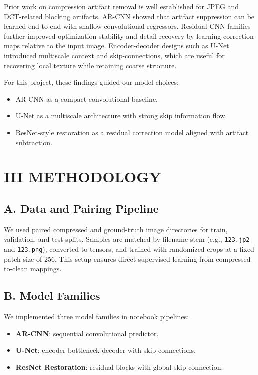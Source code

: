 \documentclass[12pt]{article}
\begin{document}
Prior work on compression artifact removal is well established for JPEG and DCT-related blocking artifacts. AR-CNN showed that artifact suppression can be learned end-to-end with shallow convolutional regressors. Residual CNN families further improved optimization stability and detail recovery by learning correction maps relative to the input image. Encoder-decoder designs such as U-Net introduced multiscale context and skip-connections, which are useful for recovering local texture while retaining coarse structure.

For this project, these findings guided our model choices:
\begin{itemize}
    \item AR-CNN as a compact convolutional baseline.
    \item U-Net as a multiscale architecture with strong skip information flow.
    \item ResNet-style restoration as a residual correction model aligned with artifact subtraction.
\end{itemize}

\section*{{\large III}\small{ METHODOLOGY}}

\subsection*{A. Data and Pairing Pipeline}

We used paired compressed and ground-truth image directories for train, validation, and test splits. Samples are matched by filename stem (e.g., \texttt{123.jp2} and \texttt{123.png}), converted to tensors, and trained with randomized crops at a fixed patch size of 256. This setup ensures direct supervised learning from compressed-to-clean mappings.

\subsection*{B. Model Families}

We implemented three model families in notebook pipelines:
\begin{itemize}
    \item \textbf{AR-CNN}: sequential convolutional predictor.
    \item \textbf{U-Net}: encoder-bottleneck-decoder with skip-connections.
    \item \textbf{ResNet Restoration}: residual blocks with global skip connection.
\end{itemize}
\end{document}

